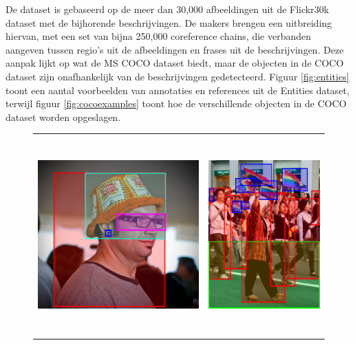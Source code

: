 De dataset is gebaseerd op de meer dan 30,000 afbeeldingen uit de Flickr30k  dataset met de bijhorende beschrijvingen. De makers brengen een uitbreiding hiervan, met een set van bijna 250,000 coreference chains, die verbanden aangeven tussen regio's uit de afbeeldingen en frases uit de beschrijvingen. Deze aanpak lijkt op wat de MS COCO  dataset biedt, maar de objecten in de COCO dataset zijn onafhankelijk van de beschrijvingen gedetecteerd. Figuur \ref{fig:entities}  toont een aantal voorbeelden van annotaties en references uit de Entities dataset, terwijl figuur \ref{fig:cocoexamples} toont hoe de verschillende objecten in de COCO dataset worden opgeslagen. 

\begin{figure}[!tb]
    \centering
    \begin{tabular}[t]{cc}
      \includegraphics[height=3.0in]{Images/example_hat.png} \vspace{-3mm}&
      \includegraphics[height=3.0in]{Images/example_parade.png}\\

\end{tabular}
\end{figure}
